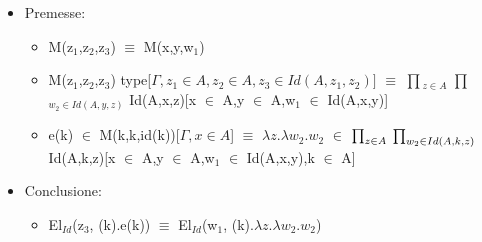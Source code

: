 \begin{itemize}
\item Premesse:
\begin{itemize}
\item M(z$_1$,z$_2$,z$_3$) $\equiv$ M(x,y,w$_1$)
\item M(z$_1$,z$_2$,z$_3$) type[$\Gamma,z_1 \in A,z_2 \in A,z_3 \in Id(A,z_1,z_2)]$ $\equiv$ {\scriptsize$\prod$}$_{z \in A}$ {\scriptsize$\prod$}$_{w_2 \in Id(A,y,z)}$ Id(A,x,z)[x $\in$ A,y $\in$ A,w$_1$ $\in$ Id(A,x,y)]
\item e(k) $\in$ M(k,k,id(k))[$\Gamma,x \in A$] $\equiv$ $\lambda z.\lambda w_2.w_2$ $\in$ ${\scriptsize\prod}_{z \in A}$ ${\scriptsize\prod}_{w_2 \in Id(A,k,z)}$ Id(A,k,z)[x $\in$ A,y $\in$ A,w$_1$ $\in$ Id(A,x,y),k $\in$ A]
\end{itemize}
\item Conclusione:
\begin{itemize}
\item El$_{Id}$(z$_3$, (k).e(k)) $\equiv$ El$_{Id}$(w$_1$, (k).$\lambda z.\lambda w_2.w_2$)
\end{itemize}
\end{itemize}

